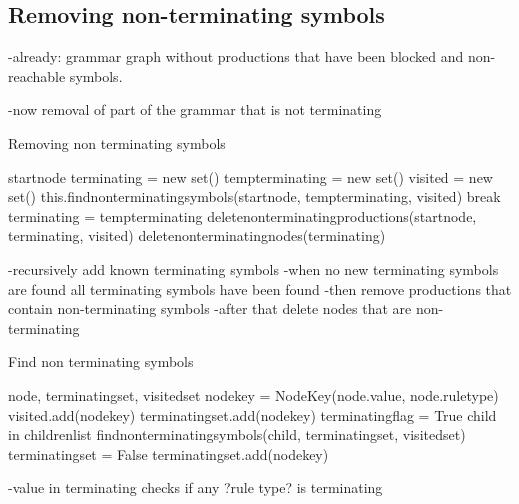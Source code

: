 \subsection{Removing non-terminating symbols}
-already: grammar graph without productions that have been blocked and non-reachable symbols.

-now removal of part of the grammar that is not terminating


\begin{algorithm}[H]
\caption{Removing non terminating symbols}
\begin{algorithmic}[1] 
\Require start\textunderscore node
\State terminating = new set()
\State temp\textunderscore terminating = new set()
	\State visited = new set()
	\State this.find\textunderscore non\textunderscore terminating\textunderscore symbols(start\textunderscore node, temp\textunderscore terminating, visited)
		\State break
	\Else
		\State terminating = temp\textunderscore terminating
	\EndIf
\EndWhile
\State delete\textunderscore non\textunderscore terminating\textunderscore productions(start\textunderscore node, terminating, visited)
\State delete\textunderscore non\textunderscore terminating\textunderscore nodes(terminating)
\end{algorithmic}
\label{alg:remove_non_terminating_symbols}
\end{algorithm}
-recursively add known terminating symbols
-when no new terminating symbols are found all terminating symbols have been found
-then remove productions that contain non-terminating symbols
-after that delete nodes that are non-terminating

\begin{algorithm}[H]
\caption{Find non terminating symbols}
\begin{algorithmic}[1] 
\Require node, terminating\textunderscore set, visited\textunderscore set
\State node\textunderscore key = Node\textunderscore Key(node.value, node.rule\textunderscore type)
	\State visited\textunderscore .add(node\textunderscore key)
			\State terminating\textunderscore set.add(node\textunderscore key)
		\Else
			\State terminating\textunderscore flag = True
			\ForAll child in children\textunderscore list
				\State find\textunderscore non\textunderscore terminating\textunderscore symbols(child, terminating\textunderscore set, visited\textunderscore set)		
					\State terminating\textunderscore set = False
				\EndIf
			\EndFor
				\State terminating\textunderscore set.add(node\textunderscore key)
			\EndIf
		\EndIf
	\EndFor
\EndIf
\end{algorithmic}
\label{alg:find_non_terminating_symbols}
\end{algorithm}
-value in terminating checks if any ?rule type? is terminating


